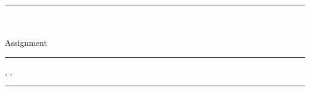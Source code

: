 \documentclass[a4paper,%
11pt,%
]{scrartcl}
\begin{document}
\hrule
\vspace*{2ex}
\begin{center}
{\LARGE\textbf{\fach}}\\
{\large{}%
  \semester \\
  Assignment \excNmbr\\
}
\end{center}

\hrule
\vspace*{1ex}

\noindent
\nname, \vname, \mtrnmbr
\vspace*{1ex}
\hrule

\setlength{\parindent}{0cm}







\end{document}

